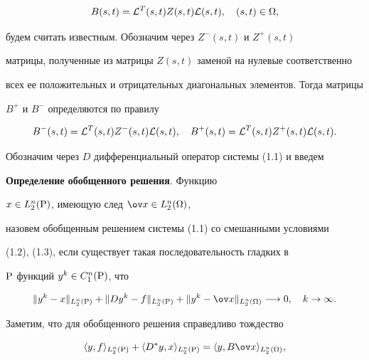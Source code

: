 $$


B(s,t) = {\cal L}^{T}(s,t) Z(s,t) {\cal L}(s,t),\quad (s,t) \in \Omega,


$$


будем считать известным. Обозначим через $Z^{-}(s,t)$ и $Z^{+}(s,t)$


матрицы, полученные из матрицы $Z(s,t)$ заменой на нулевые соответственно


всех ее положительных и отрицательных диагональных элементов. Тогда матрицы


$B^+$ и $B^-$ определяются по правилу


$$


B^{-}(s,t) = {\cal L}^{T}(s,t) Z^{-}(s,t) {\cal L}(s,t),\quad


B^{+}(s,t) = {\cal L}^{T}(s,t) Z^{+}(s,t) {\cal L}(s,t). 


$$





Обозначим через $D$ дифференциальный оператор системы (1.1) и введем





{\bf Определение обобщенного решения}. Функцию


$x \in L_2^n(\P)$, имеющую след $\ov x \in L_2^n({\Omega})$,


назовем обобщенным решением системы (1.1) со смешанными условиями


(1.2), (1.3), если существует такая последовательность гладких в


$\P$ функций $y^k \in C_1^n(\P)$, что


\begin{equation}


\| y^k - x \|_{L_2^n(\P)} + 


\| Dy^k - f \|_{L_2^n(\P)} + 


\| y^k - {\ov x} \|_{L_2^n({\Omega})}


\longrightarrow 0,\quad k \rightarrow \infty.


\end{equation}





Заметим, что для обобщенного решения справедливо тождество


\begin{equation}


\la y,f \ra_{L_2^n(\P)} + 


\la D^{*}y,x \ra_{L_2^n(\P)} = 


\la y,B{\ov x} \ra_{L_2^n({\Omega})},


\end{equation}


